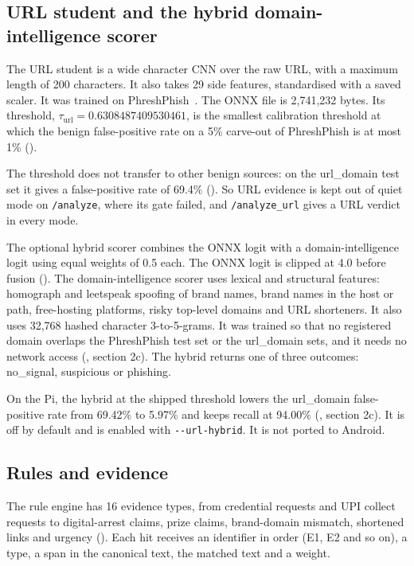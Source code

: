 \subsection{URL student and the hybrid domain-intelligence scorer}
\label{sec:url}

The URL student is a wide character CNN over the raw URL, with a maximum length of 200 characters. It also takes 29 side features, standardised with a saved scaler. It was trained on PhreshPhish~\cite{phreshphish}. The ONNX file is 2,741,232 bytes. Its threshold, $\tau_{\text{url}}=$\newline $0.6308487409530461$, is the smallest calibration threshold at which the benign false-positive rate on a 5\% carve-out of PhreshPhish is at most 1\% ().

The threshold does not transfer to other benign sources: on the url\_domain test set it gives a false-positive rate of 69.4\% (). So URL evidence is kept out of quiet mode on \texttt{/analyze}, where its gate failed, and \texttt{/analyze\_url} gives a URL verdict in every mode.

The optional hybrid scorer combines the ONNX logit with a domain-intelligence logit using equal weights of 0.5 each. The ONNX logit is clipped at 4.0 before fusion (). The domain-intelligence scorer uses lexical and structural features: homograph and leetspeak spoofing of brand names, brand names in the host or path, free-hosting platforms, risky top-level domains and URL shorteners. It also uses 32,768 hashed character 3-to-5-grams. It was trained so that no registered domain overlaps the PhreshPhish test set or the url\_domain sets, and it needs no network access (, section 2c). The hybrid returns one of three outcomes: no\_signal, suspicious or phishing.

On the Pi, the hybrid at the shipped threshold lowers the url\_domain false-positive rate from 69.42\% to 5.97\% and keeps recall at 94.00\% (, section 2c)\prose. It is off by default and is enabled with \verb|--url-hybrid|. It is not ported to Android.

\subsection{Rules and evidence}
\label{sec:rules}

The rule engine has 16 evidence types, from credential requests and UPI collect requests to digital-arrest claims, prize claims, brand-domain mismatch, shortened links and urgency (). Each hit receives an identifier in order (E1, E2 and so on), a type, a span in the canonical text, the matched text and a weight.

